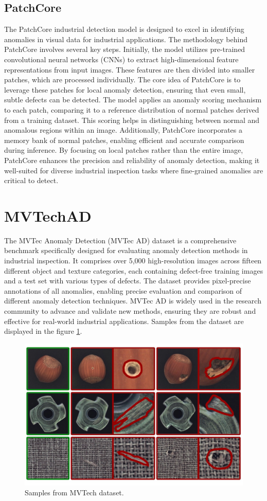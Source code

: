 \subsection{PatchCore}
\label{patchcore}
The PatchCore industrial detection model is designed to excel in identifying anomalies in visual data for industrial applications. The methodology behind PatchCore involves several key steps. Initially, the model utilizes pre-trained convolutional neural networks (CNNs) to extract high-dimensional feature representations from input images. These features are then divided into smaller patches, which are processed individually. The core idea of PatchCore is to leverage these patches for local anomaly detection, ensuring that even small, subtle defects can be detected. The model applies an anomaly scoring mechanism to each patch, comparing it to a reference distribution of normal patches derived from a training dataset. This scoring helps in distinguishing between normal and anomalous regions within an image. Additionally, PatchCore incorporates a memory bank of normal patches, enabling efficient and accurate comparison during inference. By focusing on local patches rather than the entire image, PatchCore enhances the precision and reliability of anomaly detection, making it well-suited for diverse industrial inspection tasks where fine-grained anomalies are critical to detect.

\section{MVTechAD}
\label{mvtech}
The MVTec Anomaly Detection (MVTec AD) dataset is a comprehensive benchmark specifically designed for evaluating anomaly detection methods in industrial inspection. It comprises over 5,000 high-resolution images across fifteen different object and texture categories, each containing defect-free training images and a test set with various types of defects. The dataset provides pixel-precise annotations of all anomalies, enabling precise evaluation and comparison of different anomaly detection techniques. MVTec AD is widely used in the research community to advance and validate new methods, ensuring they are robust and effective for real-world industrial applications. Samples from the dataset are displayed in the figure \ref{fig:mvtec}.

\begin{figure}[h]
	\begin{center}
		\includegraphics[width=0.7\linewidth]{Chapter_2/mvtec.jpg}
	\end{center}
	\caption{Samples from MVTech dataset.}
	\label{fig:mvtec}
\end{figure}

